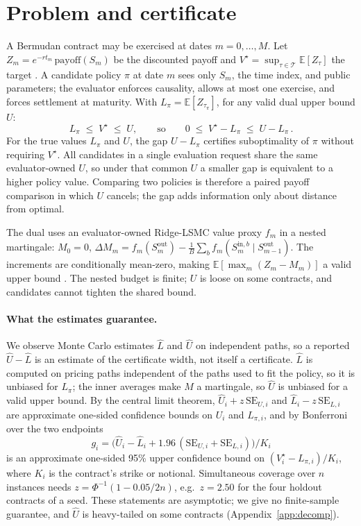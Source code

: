 \documentclass{article}
\begin{document}
\section{Problem and certificate}
\label{sec:cert}

A Bermudan contract may be exercised at dates $m=0,\dots,M$. Let $Z_m = e^{-rt_m}\,\mathrm{payoff}(S_m)$ be the discounted payoff and $V^\star = \sup_{\tau \in \mathcal{T}} \mathbb{E}[Z_\tau]$ the target \citep{glasserman2004monte}. A candidate policy $\pi$ at date $m$ sees only $S_m$, the time index, and public parameters; the evaluator enforces causality, allows at most one exercise, and forces settlement at maturity. With $L_\pi = \mathbb{E}[Z_{\tau_\pi}]$, for any valid dual upper bound $U$:
\begin{equation}
L_\pi \;\le\; V^\star \;\le\; U,
\qquad\text{so}\qquad
0 \;\le\; V^\star - L_\pi \;\le\; U - L_\pi\,.
\label{eq:cert}
\end{equation}
For the true values $L_\pi$ and $U$, the gap $U - L_\pi$ certifies suboptimality of $\pi$ without requiring $V^\star$. All candidates in a single evaluation request share the same evaluator-owned $U$, so under that common $U$ a smaller gap is equivalent to a higher policy value. Comparing two policies is therefore a paired payoff comparison in which $U$ cancels; the gap adds information only about distance from optimal.

The dual uses an evaluator-owned Ridge-LSMC value proxy $f_m$ \citep{longstaff2001valuing,tsitsiklis2001regression} in a nested martingale: $M_0 = 0$, $\Delta M_m = f_m(S^{\mathrm{out}}_m) - \frac{1}{B}\sum_b f_m(S^{\mathrm{in},b}_m \mid S^{\mathrm{out}}_{m-1})$. The increments are conditionally mean-zero, making $\mathbb{E}[\max_m(Z_m - M_m)]$ a valid upper bound \citep{rogers2002monte,haugh2004pricing}. The nested budget is finite; $U$ is loose on some contracts, and candidates cannot tighten the shared bound.

\paragraph{What the estimates guarantee.} We observe Monte Carlo estimates $\hat L$ and $\hat U$ on independent paths, so a reported $\hat U - \hat L$ is an estimate of the certificate width, not itself a certificate. $\hat L$ is computed on pricing paths independent of the paths used to fit the policy, so it is unbiased for $L_\pi$; the inner averages make $M$ a martingale, so $\hat U$ is unbiased for a valid upper bound. By the central limit theorem, $\hat U_i + z\,\mathrm{SE}_{U,i}$ and $\hat L_i - z\,\mathrm{SE}_{L,i}$ are approximate one-sided confidence bounds on $U_i$ and $L_{\pi,i}$, and by Bonferroni over the two endpoints
\[
g_i = \bigl(\hat U_i - \hat L_i + 1.96\,(\mathrm{SE}_{U,i} + \mathrm{SE}_{L,i})\bigr)/K_i
\]
is an approximate one-sided 95\% upper confidence bound on $(V^\star_i - L_{\pi,i})/K_i$, where $K_i$ is the contract's strike or notional. Simultaneous coverage over $n$ instances needs $z = \Phi^{-1}(1 - 0.05/2n)$, e.g.\ $z = 2.50$ for the four holdout contracts of a seed. These statements are asymptotic; we give no finite-sample guarantee, and $\hat U$ is heavy-tailed on some contracts (Appendix~\ref{app:decomp}).
\end{document}

